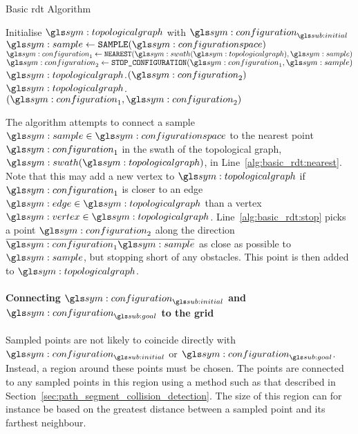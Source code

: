 \begin{itemize}
						\begin{algorithm}[ht]
							\caption{Basic \gls{rdt} Algorithm}%
							\label{alg:basic_rdt}
							\begin{algorithmic}[1]
									\State{} Initialise $\topologicalgraph$ with $\configuration_{\initial}$
										\State{} $\sample \gets \code{SAMPLE}(\configurationspace)$ 								\label{alg:basic_rdt:sample}%
										\State{} $\configuration_1 \gets \code{NEAREST}(\swath(\topologicalgraph),\sample)$ 		\label{alg:basic_rdt:nearest}%
										\State{} $\configuration_2 \gets \code{STOP\_CONFIGURATION}(\configuration_1, \sample)$ 	\label{alg:basic_rdt:stop}%
											\State{} $\topologicalgraph$.$(\configuration_2)$ 					\label{alg:basic_rdt:add_vertex}%
											\State{} $\topologicalgraph$.$(\configuration_1, \configuration_2)$ 	\label{alg:basic_rdt:add_edge}%
										\EndIf{}
									\EndWhile{}
								\EndProcedure{}
							\end{algorithmic}
						\end{algorithm}

						The algorithm attempts to connect a sample
						$\sample\in\configurationspace$ to the nearest point
						$\configuration_1$ in the swath of the topological
						graph, $\swath(\topologicalgraph)$, in
						Line~\ref{alg:basic_rdt:nearest}. Note that this may add
						a new vertex to $\topologicalgraph$ if
						$\configuration_1$ is closer to an edge
						$\edge\in\topologicalgraph$ than a vertex
						$\vertex\in\topologicalgraph$.
						Line~\ref{alg:basic_rdt:stop} picks a point
						$\configuration_2$ along the direction
						$\vecline{\configuration_1}{\sample}$ as close as
						possible to $\sample$, but stopping short of any
						obstacles. This point is then added to
						$\topologicalgraph$.

				\end{itemize}

			\paragraph{Connecting $\configuration_{\initial}$ and
			$\configuration_{\goal}$ to the grid}%
			\label{sec:connecting_initial_configuration_and_goal_configuration_to_the_grid}

				Sampled points are not likely to coincide directly with
				$\configuration_{\initial}$ or $\configuration_{\goal}$.
				Instead, a region around these points must be chosen. The points
				are connected to any sampled points in this region using a
				method such as that described in
				Section~\ref{sec:path_segment_collision_detection}. The size of
				this region can for instance be based on the greatest distance
				between a sampled point and its farthest neighbour.

